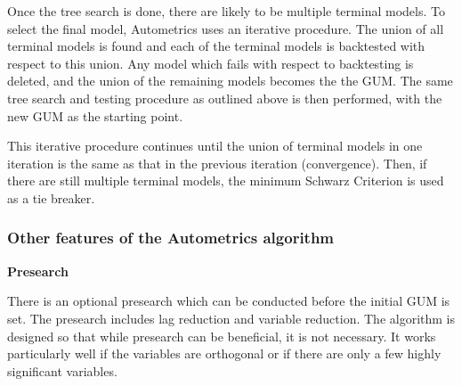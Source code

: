 \documentclass[11pt, oneside]{book}   	%
\begin{document}
\begin{enumerate}
Once the tree search is done, there are likely to be multiple terminal models. To select the final model, Autometrics uses an iterative procedure. The union of all terminal models is found and each of the terminal models is backtested with respect to this union. Any model which fails with respect to backtesting is deleted, and the union of the remaining models becomes the the GUM. The same tree search and testing procedure as outlined above is then performed, with the new GUM as the starting point. 

This iterative procedure continues until the union of terminal models in one iteration is the same as that in the previous iteration (convergence). Then, if there are still multiple terminal models, the minimum Schwarz Criterion is used as a tie breaker. 

\end {enumerate}

\subsubsection{Other features of the Autometrics algorithm}

\textbf{Presearch}

There is an optional presearch which can be conducted before the initial GUM is set. The presearch includes lag reduction and variable reduction. The algorithm is designed so that while presearch can be beneficial, it is not necessary. It works particularly well if the variables are orthogonal or if there are only a few highly significant variables. 






\end{document}
